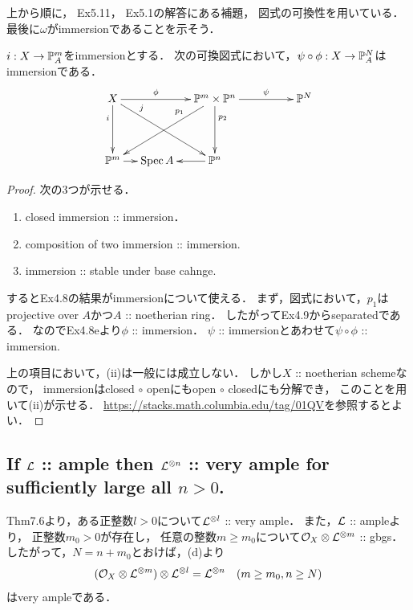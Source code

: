 \documentclass[a4paper]{jsarticle}
\begin{document}
    上から順に，
    Ex5.11，
    Ex5.1の解答にある補題，
    図式の可換性を用いている．
    最後に$\omega$がimmersionであることを示そう．
    \begin{Claim}
        $i: X \to \mathbb{P}^m_A$をimmersionとする．
        次の可換図式において，$\psi \circ \phi: X \to \mathbb{P}^N_A$はimmersionである．
        \[ 
        \xymatrix@C=12pt@R=40pt
        {
            X \ar[d]_(.3){i}\ar[rrd]^(.25){j}\ar[rr]^-{\phi}&
                {} &
                \proj^m \times \proj^n \ar[lld]_(.3){p_1}\ar[d]^(.3){p_2}\ar[rrr]^-{\psi}&
                {} &
                {} &
                \proj^N \\
            \proj^m \ar[r]& \Spec A &\ar[l] \proj^n & {} & {}
        }
        \]
    \end{Claim}
    \begin{proof}
        次の3つが示せる．
        \begin{enumerate}[label=(\roman*)]
            \item closed immersion :: immersion．
            \item composition of two immersion :: immersion.
            \item immersion :: stable under base cahnge.
        \end{enumerate}
        するとEx4.8の結果がimmersionについて使える．
        まず，図式において，$p_1$はprojective over $A$かつ$A$ :: noetherian ring．
        したがってEx4.9からseparatedである．
        なのでEx4.8eより$\phi$ :: immersion．
        $\psi$ :: immersionとあわせて$\psi \circ \phi$ :: immersion.
        
        上の項目において，(ii)は一般には成立しない．
        しかし$X$ :: noetherian schemeなので，
        immersionはclosed $\circ$ openにもopen $\circ$ closedにも分解でき，
        このことを用いて(ii)が示せる．
        \url{https://stacks.math.columbia.edu/tag/01QV}を参照するとよい．
    \end{proof}

    \subsection{If $\mathcal{L}$ :: ample then $\mathcal{L}^{\otimes n}$ :: very ample for sufficiently large all $n>0$.}
    Thm7.6より，ある正整数$l>0$について$\mathcal{L}^{\otimes l}$ :: very ample．
    また，$\mathcal{L}$ :: ampleより，
    正整数$m_0>0$が存在し，
    任意の整数$m \geq m_0$について$\mathcal{O}_X \otimes \mathcal{L}^{\otimes m}$ :: gbgs．
    したがって，$N=n+m_0$とおけば，(d)より
    \[ (\mathcal{O}_X \otimes \mathcal{L}^{\otimes m}) \otimes \mathcal{L}^{\otimes l}=\mathcal{L}^{\otimes n} ~~~ (m \geq m_0, n \geq N) \]
    はvery ampleである．
\end{document}
